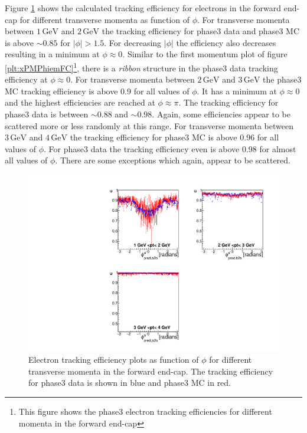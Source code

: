 \documentclass[a4paper,11pt,twosided,final,german,openbib,pdftex,listof=totoc,bibliography=totoc]{scrbook}
\begin{document}
Figure \ref{plt:xPtMPhiemFC3} shows the calculated tracking efficiency for electrons in the forward end-cap for different transverse momenta as function of $\phi$. 
For transverse momenta between $1\,\textrm{GeV}$ and $2\,\textrm{GeV}$ the tracking efficiency for phase3 data and phase3 MC is above $\sim 0.85$ for $|\phi| >1.5$. For decreasing $|\phi|$ the efficiency also decreases resulting in a minimum at $\phi \approx 0$. Similar to the first momentum plot of figure \ref{plt:xPMPhiemFC}\footnote{This figure shows the phase3 electron tracking efficiencies for different momenta in the forward end-cap}, there is a \textit{ribbon} structure in the phase3 data tracking efficiency at $\phi \approx 0$.
For transverse momenta between $2\,\textrm{GeV}$ and $3\,\textrm{GeV}$ the phase3 MC tracking efficiency is above 0.9 for all values of $\phi$. It has a minimum at $\phi \approx 0$ and the highest efficiencies are reached at $\phi \approx \pi$. The tracking efficiency for phase3 data is between $\sim 0.88$ and $\sim 0.98$. Again, some efficiencies appear to be scattered more or less randomly at this range. 
For transverse momenta between $3\,\textrm{GeV}$ and $4\,\textrm{GeV}$ the tracking efficiency for phase3 MC is above 0.96 for all values of $\phi$. For phase3 data the tracking efficiency even is above 0.98 for almost all values of $\phi$. There are some exceptions which again, appear to be scattered.


\begin{figure}[!htbp]
	\centering
	\includegraphics[width=\textwidth]{Plots/master3/xPtMPhiemFCP3}
	\caption[Transverse Momentum $\phi$ Electron Forward End-Cap Efficiency Phase3]{Electron tracking efficiency plots as function of $\phi$ for different transverse momenta in the forward end-cap. The tracking efficiency for phase3 data is shown in blue and phase3 MC in red.}
	\label{plt:xPtMPhiemFC3}
\end{figure}
\end{document}
